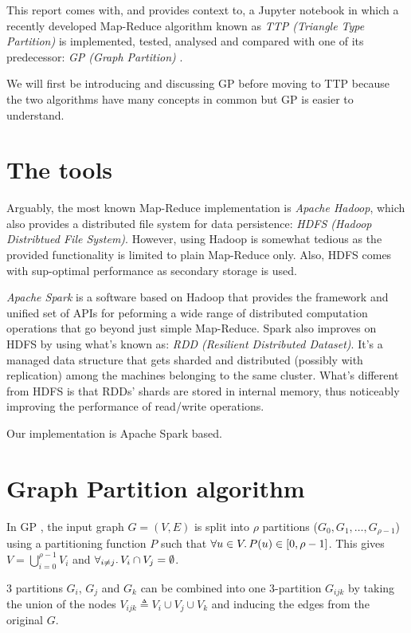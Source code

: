 \documentclass[paper=a4, fontsize=11pt]{scrartcl}
\numberwithin{equation}{section}
\numberwithin{figure}{section}
\numberwithin{table}{section}
\begin{document}
This report comes with, and provides context to, a Jupyter notebook in which a
recently developed Map-Reduce algorithm known as \emph{TTP (Triangle Type
Partition)} \cite{park2013efficient} is implemented, tested, analysed and
compared with one of its predecessor: \emph{GP (Graph Partition)}
\cite{suri2011counting}.

We will first be introducing and discussing GP before moving to TTP because the
two algorithms have many concepts in common but GP is easier to understand.

\section{The tools}
Arguably, the most known Map-Reduce implementation is \emph{Apache Hadoop},
which also provides a distributed file system for data persistence: \emph{HDFS
(Hadoop Distribtued File System)}. However, using Hadoop is somewhat tedious as
the provided functionality is limited to plain Map-Reduce only. Also, HDFS comes
with sup-optimal performance as secondary storage is used.

\emph{Apache Spark} is a software based on Hadoop that provides the framework
and unified set of APIs for peforming a wide range of distributed computation
operations that go beyond just simple Map-Reduce. Spark also improves on HDFS by
using what's known as: \emph{RDD (Resilient Distributed Dataset)}. It's a
managed data structure that gets sharded and distributed (possibly with
replication) among the machines belonging to the same cluster. What's different
from HDFS is that RDDs' shards are stored in internal memory, thus noticeably
improving the performance of read/write operations.

Our implementation is Apache Spark based.

\section{Graph Partition algorithm}
In GP \cite{suri2011counting}, the input graph $G=(V, E)$ is split into $\rho$
partitions ($G_0, G_1, \dots, G_{\rho-1}$) using a partitioning function $P$
such that $\forall u \in V \ldotp P(u) \in [0, \rho-1]$. This gives
$V=\bigcup_{i=0}^{\rho-1} V_i$ and $\forall_{i\neq j} \ldotp V_i \cap V_j =
\emptyset$.

3 partitions $G_i$, $G_j$ and $G_k$ can be combined into one 3-partition
$G_{ijk}$ by taking the union of the nodes $V_{ijk} \triangleq V_i \cup V_j
\cup V_k$ and inducing the edges from the original $G$.
\end{document}
